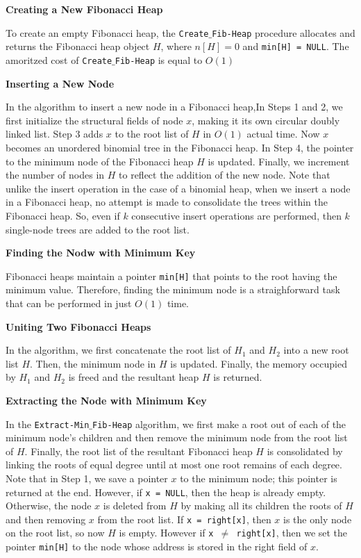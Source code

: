 \vskip 3mm
{\bf Creating a New Fibonacci Heap}

\vskip 1mm
To create an empty Fibonacci heap, the {\tt Create$\_$Fib-Heap} procedure allocates and returns the Fibonacci heap object $H$, where $n[H] = 0$ and {\tt min[H] = NULL}. The amoritzed cost of {\tt Create$\_$Fib-Heap} is equal to $O(1)$

\vskip 3mm
{\bf Inserting a New Node}

\vskip 1mm
In the algorithm to insert a new node in a Fibonacci heap,In Steps 1 and 2, we first initialize the structural fields of node $x$, making it its own circular doubly linked list. Step 3 adds $x$ to the root list of $H$ in $O(1)$ actual time. Now $x$ becomes an unordered binomial tree in the Fibonacci heap. In Step 4, the pointer to the minimum node of the Fibonacci heap $H$ is updated. Finally, we increment the number of nodes in $H$ to reflect the addition of the new node. Note that unlike the insert operation in the case of a binomial heap, when we insert a node in a Fibonacci heap, no attempt is made to consolidate the trees within the Fibonacci heap. So, even if $k$ consecutive insert operations are performed, then $k$ single-node trees are added to the root list.

\vskip 3mm
{\bf Finding the Nodw with Minimum Key}

\vskip 1mm
Fibonacci heaps maintain a pointer {\tt min[H]} that points to the root having the minimum value. Therefore, finding the minimum node is a straighforward task that can be performed in just $O(1)$ time.

\vskip 3mm
{\bf Uniting Two Fibonacci Heaps}

\vskip 1mm
In the algorithm, we first concatenate the root list of $H_1$ and $H_2$ into a new root list $H$. Then, the minimum node in $H$ is updated. Finally, the memory occupied by $H_1$ and $H_2$ is freed and the resultant heap $H$ is returned.

\vskip 3mm
{\bf Extracting the Node with Minimum Key}

\vskip 1mm
In the {\tt Extract-Min$\_$Fib-Heap} algorithm, we first make a root out of each of the minimum node's children and then remove the minimum node from the root list of $H$. Finally, the root list of the resultant Fibonacci heap $H$ is consolidated by linking the roots of equal degree until at most one root remains of each degree. Note that in Step 1, we save a pointer $x$ to the minimum node; this pointer is returned at the end. However, if {\tt x = NULL}, then the heap is already empty. Otherwise, the node $x$ is deleted from $H$ by making all its children the roots of $H$ and then removing $x$ from the root list. If {\tt x = right[x]}, then $x$ is the only node on the root list, so now $H$ is empty. However if {\tt x $\neq$ right[x]}, then we set the pointer {\tt min[H]} to the node whose address is stored in the right field of $x$.

